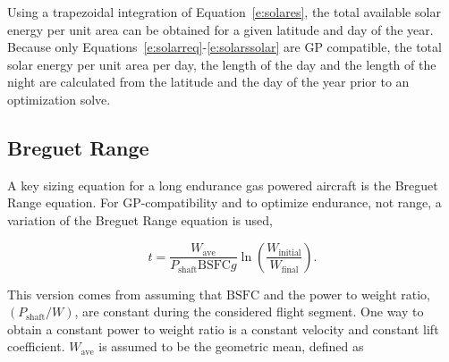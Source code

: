 \documentclass[]{aiaa-tc}%
\begin{document}
    Using a trapezoidal integration of Equation~\eqref{e:solares}, the total available solar energy per unit area can be obtained for a given latitude and day of the year. Because only Equations~\eqref{e:solarreq}-\eqref{e:solarssolar} are GP compatible, the total solar energy per unit area per day, the length of the day and the length of the night are calculated from the latitude and the day of the year prior to an optimization solve.

\subsection{Breguet Range}

A key sizing equation for a long endurance gas powered aircraft is the Breguet Range equation.  
For GP-compatibility and to optimize endurance, not range, a variation of the Breguet Range equation is used, 

\begin{equation}
    \label{e:breguetendurance}
    t = \frac{W_{\text{ave}}}{P_{\text{shaft}}\text{BSFC}g} \ln{\left( \frac{W_{\text{initial}}}{W_{\text{final}}}\right)}.
\end{equation}

%
% 
% 
% 
% 

This version comes from assuming that $\text{BSFC}$ and the power to weight ratio, $(P_{\text{shaft}}/W)$, are constant during the considered flight segment. 
One way to obtain a constant power to weight ratio is a constant velocity and constant lift coefficient.\cite{br2}
$W_{\text{ave}}$ is assumed to be the geometric mean, defined as

% 
% 
% 
% 
\end{document}
